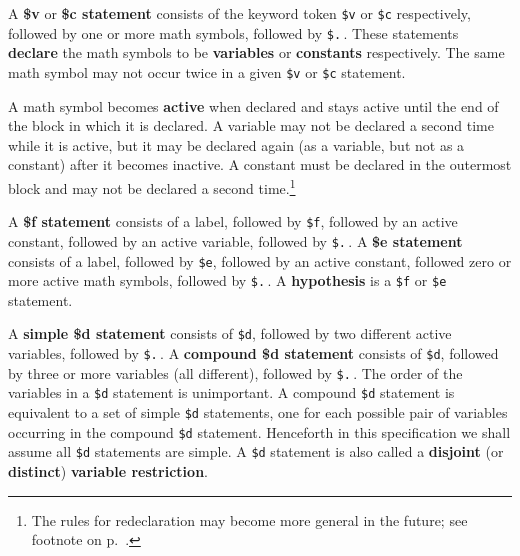 
A {\bf \$v} or {\bf \$c statement} consists of the keyword token \texttt{\$v} or \texttt{\$c} respectively,
followed by one or more math symbols, followed by \texttt{\$.}\,.  These
statements {\bf declare} the math symbols to be {\bf
variables} or {\bf constants}
respectively. The same math symbol may not occur twice in a given \texttt{\$v} or
\texttt{\$c} statement.


A math symbol becomes {\bf active} when declared
and stays active until the end of the block in which it is declared.  A
variable may not be declared a second time while it is active, but it
may be declared again (as a variable, but not as a constant) after it
becomes inactive.  A constant must be declared in the outermost block and may
not be declared a second time.\footnote{The rules for redeclaration may
become more general in the future; see footnote on
p.~\pageref{redeclarationf}.}

A {\bf \$f statement} consists of a label,
followed by \texttt{\$f}, followed by an active constant, followed by an
active variable, followed by \texttt{\$.}\,.  A {\bf \$e
statement} consists of a label, followed
by \texttt{\$e}, followed by an active constant, followed zero or more
active math symbols, followed by \texttt{\$.}\,.  A {\bf
hypothesis} is a \texttt{\$f} or \texttt{\$e}
statement.

A {\bf simple \$d statement}
consists of \texttt{\$d}, followed by two different active variables,
followed by \texttt{\$.}\,.  A {\bf compound \$d
statement} consists of
\texttt{\$d}, followed by three or more variables (all different),
followed by \texttt{\$.}\,.  The order of the variables in a
\texttt{\$d} statement is unimportant.  A compound \texttt{\$d}
statement is equivalent to a set of simple \texttt{\$d} statements, one
for each possible pair of variables occurring in the compound
\texttt{\$d} statement.  Henceforth in this specification we shall
assume all \texttt{\$d} statements are simple.  A \texttt{\$d} statement
is also called a {\bf disjoint} (or {\bf distinct}) {\bf variable
restriction}.

